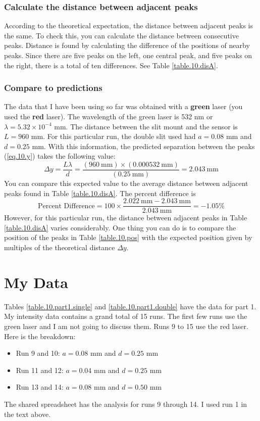 \subsubsection{Calculate the distance between adjacent peaks}
%
According to the theoretical expectation, the distance between adjacent peaks is the same. To check this, you can calculate the distance between consecutive peaks. Distance is found by calculating the difference of the positions of nearby peaks. Since there are five peaks on the left, one central peak, and five peaks on the right, there is a total of ten differences. See Table \ref{table.10.disA}.
%
\subsubsection{Compare to predictions}
%
The data that I have been using so far was obtained with a \textbf{green} laser (you used the \textbf{red} laser). The wavelength of the green laser is 532 nm or $\lambda = 5.32 \times 10^{-4}$ mm. The distance between the slit mount and the sensor is $L = 960$ mm. For this particular run, the double slit used had $a = 0.08$ mm and $d = 0.25$ mm. With this information, the predicted separation between the peaks (\ref{eq.10.y}) takes the following value:
\begin{equation}
	\Delta y = \frac{L \lambda}{d} = \frac{(960 \ \text{mm}) \times (0.000532 \ \text{mm})}{(0.25 \ \text{mm})} = 2.043 \ \text{mm}
\end{equation}
You can compare this expected value to the average distance between adjacent peaks found in Table \ref{table.10.disA}. The percent difference is
\begin{equation}
	\text{Percent Difference} = 100 \times \frac{2.022 \ \text{mm} - 2.043 \ \text{mm}}{2.043 \ \text{mm}} = -1.05 \%
\end{equation}
However, for this particular run, the distance between adjacent peaks in Table \ref{table.10.disA} varies considerably. One thing you can do is to compare the position of the peaks in Table \ref{table.10.pos} with the expected position given by multiples of the theoretical distance $\Delta y$.
%
\section{My Data}
%
Tables \ref{table.10.part1.single} and \ref{table.10.part1.double} have the data for part 1. My intensity data contains a grand total of 15 runs. The first few runs use the green laser and I am not going to discuss them. Runs 9 to 15 use the red laser. Here is the breakdown:
\begin{itemize}
	\item Run 9 and 10: $a = 0.08$ mm and $d = 0.25$ mm
	\item Run 11 and 12: $a = 0.04$ mm and $d = 0.25$ mm
	\item Run 13 and 14: $a = 0.08$ mm and $d = 0.50$ mm
\end{itemize}
The shared spreadsheet has the analysis for runs 9 through 14. I used run 1 in the text above.
%
\newpage
